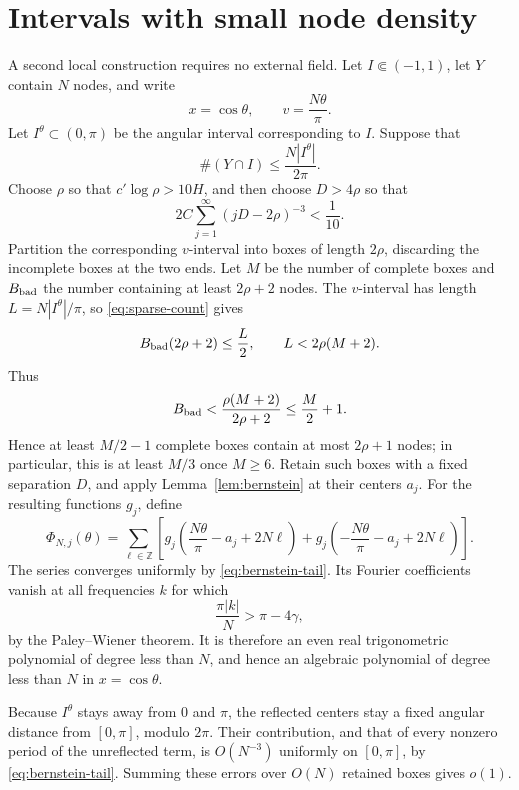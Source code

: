 \documentclass[11pt]{article}
\theoremstyle{definition}
\numberwithin{equation}{section}
\newcommand{\Z}{\mathbb Z}
\begin{document}
\section{Intervals with small node density}\label{sec:sparse}

A second local construction requires no external field.
Let \(I\Subset(-1,1)\), let \(Y\) contain \(N\) nodes, and write
\[
 x=\cos\theta,\qquad v=\frac{N\theta}{\pi}.
\]
Let \(I^\theta\subset(0,\pi)\) be the angular interval corresponding
to \(I\). Suppose that
\begin{equation}\label{eq:sparse-count}
 \#(Y\cap I)\le\frac{N|I^\theta|}{2\pi}.
\end{equation}
Choose \(\rho\) so that \(c'\log\rho>10H\), and then choose
\(D>4\rho\) so that
\begin{equation}\label{eq:sparse-tail-choice}
 2C\sum_{j=1}^{\infty}(jD-2\rho)^{-3}<\frac1{10}.
\end{equation}
Partition the corresponding \(v\)-interval into boxes of length
\(2\rho\), discarding the incomplete boxes at the two ends. Let \(M\)
be the number of complete boxes and \(B_{\rm bad}\) the number
containing at least \(2\rho+2\) nodes. The \(v\)-interval has length
\(L=N|I^\theta|/\pi\), so \eqref{eq:sparse-count} gives
\[
 B_{\rm bad}(2\rho+2)\le \frac L2,
 \qquad L<2\rho(M+2).
\]
Thus
\[
 B_{\rm bad}<\frac{\rho(M+2)}{2\rho+2}\le\frac M2+1.
\]
Hence at least \(M/2-1\) complete boxes contain at most \(2\rho+1\)
nodes; in particular, this is at least \(M/3\) once \(M\ge6\). Retain such boxes with a fixed separation \(D\),
and apply Lemma~\ref{lem:bernstein} at their centers \(a_j\).
For the resulting functions \(g_j\), define
\begin{equation}\label{eq:periodization}
 \Phi_{N,j}(\theta)=
 \sum_{\ell\in\Z}
 \left[
 g_j\left(\frac{N\theta}{\pi}-a_j+2N\ell\right)
 +g_j\left(-\frac{N\theta}{\pi}-a_j+2N\ell\right)
 \right].
\end{equation}
The series converges uniformly by \eqref{eq:bernstein-tail}.
Its Fourier coefficients vanish at all frequencies \(k\) for which
\[
 \frac{\pi|k|}{N}>\pi-4\gamma,
\]
by the Paley--Wiener theorem. It is therefore an even real
trigonometric polynomial of degree less than \(N\), and hence an
algebraic polynomial of degree less than \(N\) in \(x=\cos\theta\).

Because \(I^\theta\) stays away from \(0\) and \(\pi\), the reflected
centers stay a fixed angular distance from \([0,\pi]\), modulo
\(2\pi\). Their contribution, and that of every nonzero period of
the unreflected term, is \(O(N^{-3})\) uniformly on \([0,\pi]\), by
\eqref{eq:bernstein-tail}. Summing these errors over \(O(N)\)
retained boxes gives \(o(1)\).
\end{document}
